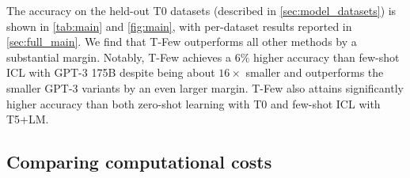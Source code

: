 The accuracy on the held-out T0 datasets (described in \ref{sec:model_datasets}) is shown in \ref{tab:main} and \ref{fig:main}, with per-dataset results reported in \ref{sec:full_main}.
We find that {\selectfont T-Few} outperforms all other methods by a substantial margin. Notably, {\selectfont T-Few} achieves a 6\% higher accuracy than few-shot ICL with GPT-3 175B despite being about $16\times$ smaller and outperforms the smaller GPT-3 variants by an even larger margin.
{\selectfont T-Few} also attains significantly higher accuracy than both zero-shot learning with T0 and few-shot ICL with T5+LM.

\begin{minipage}[l]{0.64\textwidth}
    \centering

    \label{tab:main}
\end{minipage}

\hfill

\begin{minipage}[r]{0.33\textwidth}
    \centering

    \label{tab:raft}

\end{minipage}

\subsection{Comparing computational costs}
\label{sec:costs}

